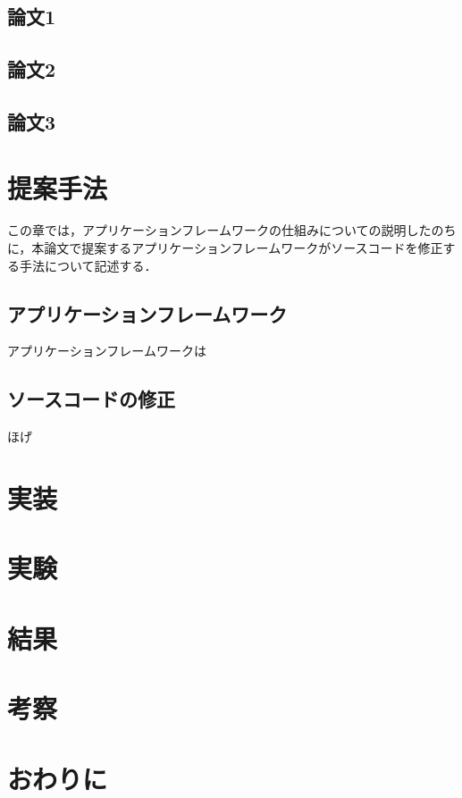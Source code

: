 \documentclass[a4paper,12pt]{jreport}
\begin{document}
\section{論文1}
\section{論文2}
\section{論文3}

\chapter{提案手法}
この章では，アプリケーションフレームワークの仕組みについての説明したのちに，本論文で提案するアプリケーションフレームワークがソースコードを修正する手法について記述する．
\section{アプリケーションフレームワーク}
アプリケーションフレームワークは

\section{ソースコードの修正}
ほげ

\chapter{実装}

\chapter{実験}

\chapter{結果}

\chapter{考察}

\chapter{おわりに}
\end{document}
